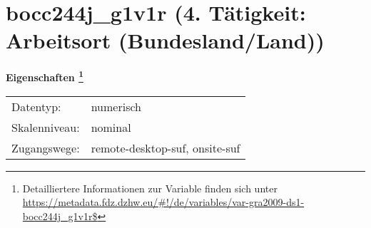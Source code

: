 
    \setcounter{footnote}{0}

    \vspace*{-1.8cm}
	\section{bocc244j\_g1v1r (4. Tätigkeit: Arbeitsort (Bundesland/Land))}
	\label{section:bocc244j_g1v1r}



    \vspace*{0.5cm}
    \noindent\textbf{Eigenschaften
	\footnote{Detailliertere Informationen zur Variable finden sich unter
		\url{https://metadata.fdz.dzhw.eu/\#!/de/variables/var-gra2009-ds1-bocc244j_g1v1r$}}}\\
	\begin{tabularx}{\hsize}{@{}lX}
	Datentyp: & numerisch \\
	Skalenniveau: & nominal \\
	Zugangswege: &
	  remote-desktop-suf, 
	  onsite-suf
 \\
    \end{tabularx}



